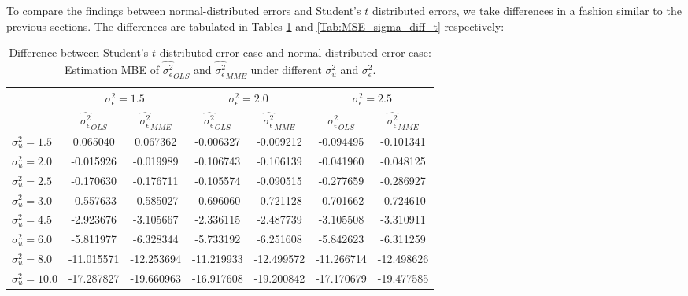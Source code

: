 \documentclass{article}
\begin{document}
To compare the findings between normal-distributed errors and Student's $t$ distributed errors, we take differences in a fashion similar to the previous sections.
The differences are tabulated in Tables \ref{Tab:MBE_sigma_diff_t} and \ref{Tab:MSE_sigma_diff_t} respectively:

\begin{table}[ht]
    \centering
    \caption{Difference between Student's $t$-distributed error case and normal-distributed error case: Estimation MBE of $\hat{\sigma^2_\epsilon}_{OLS}$ and $\hat{\sigma^2_\epsilon}_{MME}$ under different $\sigma^2_u$ and $\sigma^2_\epsilon$.}
    \label{Tab:MBE_sigma_diff_t}
    \begin{tabular}[t]{lcccccc}
        \hline
        &\multicolumn{2}{c}{$\sigma^2_\epsilon=1.5$}&\multicolumn{2}{c}{$\sigma^2_\epsilon=2.0$}&\multicolumn{2}{c}{$\sigma^2_\epsilon=2.5$}\\
        \hline
        &$\hat{\sigma^2_\epsilon}_{OLS}$&$\hat{\sigma^2_\epsilon}_{MME}$&$\hat{\sigma^2_\epsilon}_{OLS}$&
        $\hat{\sigma^2_\epsilon}_{MME}$&$\hat{\sigma^2_\epsilon}_{OLS}$&$\hat{\sigma^2_\epsilon}_{MME}$\\
        \hline
        $\sigma^2_u = 1.5$&0.065040&0.067362&-0.006327&-0.009212&-0.094495&-0.101341\\
        $\sigma^2_u = 2.0$&-0.015926&-0.019989&-0.106743&-0.106139&-0.041960&-0.048125\\
        $\sigma^2_u = 2.5$&-0.170630&-0.176711&-0.105574&-0.090515&-0.277659&-0.286927\\
        $\sigma^2_u = 3.0$&-0.557633&-0.585027&-0.696060&-0.721128&-0.701662&-0.724610\\
        $\sigma^2_u = 4.5$&-2.923676&-3.105667&-2.336115&-2.487739&-3.105508&-3.310911\\
        $\sigma^2_u = 6.0$&-5.811977&-6.328344&-5.733192&-6.251608&-5.842623&-6.311259\\
        $\sigma^2_u = 8.0$&-11.015571&-12.253694&-11.219933&-12.499572&-11.266714&-12.498626\\
        $\sigma^2_u = 10.0$&-17.287827&-19.660963&-16.917608&-19.200842&-17.170679&-19.477585\\
        \hline
    \end{tabular}
\end{table}
\end{document}
